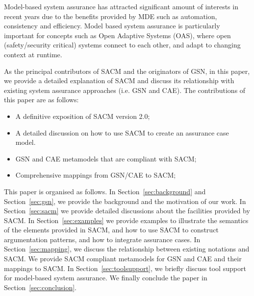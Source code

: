 Model-based system assurance has attracted significant amount of interests in recent years due to the benefits provided by MDE such as automation, consistency and efficiency. 
Model based system assurance is particularly important for concepts such as Open Adaptive Systems (OAS), where open (safety/security critical) systems connect to each other, and adapt to changing context at runtime. 

As the principal contributors of SACM and the originators of GSN, in this paper, we provide a detailed explanation of SACM and discuss its relationship with existing system assurance approaches (i.e. GSN and CAE). 
The contributions of this paper are as follows:
\begin{itemize}
	\item A definitive exposition of SACM version 2.0;
	\item A detailed discussion on how to use SACM to create an assurance case model.
	\item GSN and CAE metamodels that are compliant with SACM;
	\item Comprehensive mappings from GSN/CAE to SACM;
\end{itemize}

This paper is organised as follows. 
In Section~\ref{sec:background} and Section~\ref{sec:gsn}, we provide the background and the motivation of our work. 
In Section~\ref{sec:sacm} we provide detailed discussions about the facilities provided by SACM.
In Section~\ref{sec:examples} we provide examples to illustrate the semantics of the elements provided in SACM, and how to use SACM to construct argumentation patterns, and how to integrate assurance cases.
In Section~\ref{sec:mapping}, we discuss the relationship between existing notations and SACM. 
We provide SACM compliant metamodels for GSN and CAE and their mappings to SACM. 
In Section~\ref{sec:toolsupport}, we briefly discuss tool support for model-based system assurance. 
We finally conclude the paper in Section~\ref{sec:conclusion}.

